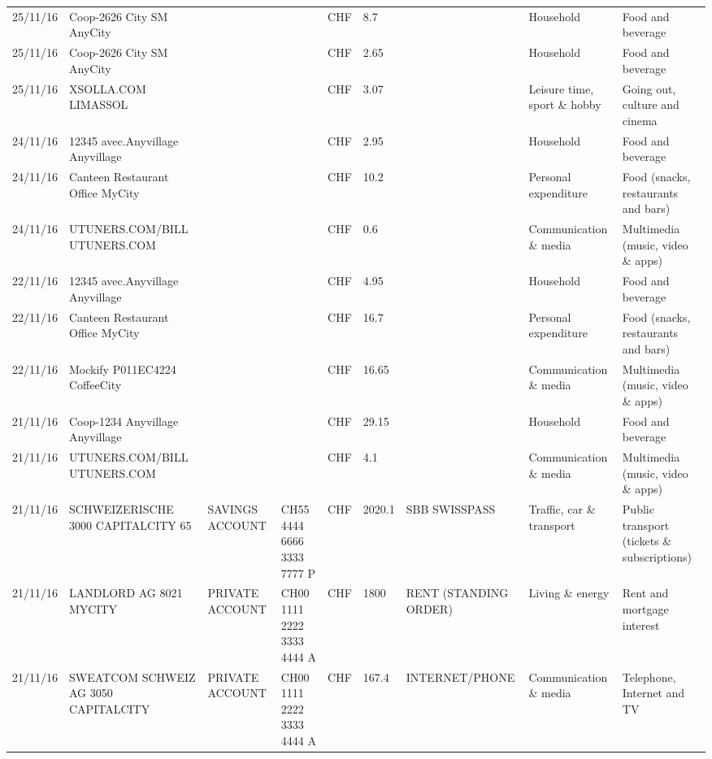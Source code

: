 \begin{landscape}
\begin{center}
\begin{longtable}{lllllllll}
		25/11/16 & Coop-2626 City SM        AnyCity &       &       & CHF   & 8.7   &       & Household & Food and beverage \\
		25/11/16 & Coop-2626 City SM        AnyCity &       &       & CHF   & 2.65  &       & Household & Food and beverage \\
		25/11/16 & XSOLLA.COM               LIMASSOL &       &       & CHF   & 3.07  &       & Leisure time, sport \& hobby & Going out, culture and cinema \\
		24/11/16 & 12345 avec.Anyvillage   Anyvillage &       &       & CHF   & 2.95  &       & Household & Food and beverage \\
		24/11/16 & Canteen Restaurant Office      MyCity &       &       & CHF   & 10.2  &       & Personal expenditure & Food (snacks, restaurants and bars) \\
		24/11/16 & UTUNERS.COM/BILL          UTUNERS.COM &       &       & CHF   & 0.6   &       & Communication \& media & Multimedia (music, video \& apps) \\
		22/11/16 & 12345 avec.Anyvillage   Anyvillage &       &       & CHF   & 4.95  &       & Household & Food and beverage \\
		22/11/16 & Canteen Restaurant Office      MyCity &       &       & CHF   & 16.7  &       & Personal expenditure & Food (snacks, restaurants and bars) \\
		22/11/16 & Mockify P011EC4224       CoffeeCity &       &       & CHF   & 16.65 &       & Communication \& media & Multimedia (music, video \& apps) \\
		21/11/16 & Coop-1234 Anyvillage    Anyvillage &       &       & CHF   & 29.15 &       & Household & Food and beverage \\
		21/11/16 & UTUNERS.COM/BILL          UTUNERS.COM &       &       & CHF   & 4.1   &       & Communication \& media & Multimedia (music, video \& apps) \\
		21/11/16 & SCHWEIZERISCHE 3000 CAPITALCITY 65 & SAVINGS ACCOUNT & CH55 4444 6666 3333 7777 P & CHF   & 2020.1 & SBB SWISSPASS & Traffic, car \& transport & Public transport (tickets \& subscriptions) \\
		21/11/16 & LANDLORD AG 8021 MYCITY & PRIVATE ACCOUNT & CH00 1111 2222 3333 4444 A & CHF   & 1800  & RENT (STANDING ORDER) & Living \& energy & Rent and mortgage interest \\
		21/11/16 & SWEATCOM SCHWEIZ AG 3050 CAPITALCITY & PRIVATE ACCOUNT & CH00 1111 2222 3333 4444 A & CHF   & 167.4 & INTERNET/PHONE & Communication \& media & Telephone,  Internet and TV \\

\end{longtable}
\end{center}
\end{landscape}
